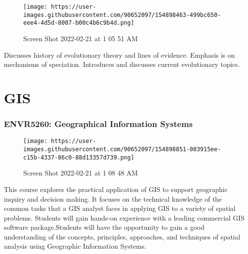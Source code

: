 \documentclass[
  letterpaper,
  DIV=11,
  numbers=noendperiod]{scrreprt}
\begin{document}
\begin{figure}

{\centering \texttt{[image: https://user-images.githubusercontent.com/90652097/154898463-499bc650-eee4-4d5d-8007-b00c4b6c9b4d.png]}

}

\caption{Screen Shot 2022-02-21 at 1 05 51 AM}

\end{figure}

Discusses history of evolutionary theory and lines of evidence. Emphasis
is on mechanisms of speciation. Introduces and discusses current
evolutionary topics.

\hypertarget{gis}{%
\section*{\texorpdfstring{\textbf{GIS}}{GIS}}\label{gis}}

\hypertarget{envr5260-geographical-information-systems}{%
\subsubsection*{\texorpdfstring{\textbf{ENVR5260: Geographical
Information
Systems}}{ENVR5260: Geographical Information Systems}}\label{envr5260-geographical-information-systems}}

\begin{figure}

{\centering \texttt{[image: https://user-images.githubusercontent.com/90652097/154898851-003915ee-c15b-4337-86c0-88d13357d739.png]}

}

\caption{Screen Shot 2022-02-21 at 1 08 48 AM}

\end{figure}

This course explores the practical application of GIS to support
geographic inquiry and decision making. It focuses on the technical
knowledge of the common tasks that a GIS analyst faces in applying GIS
to a variety of spatial problems. Students will gain hands-on experience
with a leading commercial GIS software package.Students will have the
opportunity to gain a good understanding of the concepts, principles,
approaches, and techniques of spatial analysis using Geographic
Information Systems.
\end{document}
